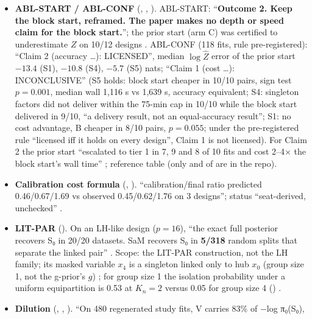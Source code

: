 \begin{itemize}
completed fits from this machine''; on 3 designs max$|\Delta$PIP$|$ up to $1.29\cdot10^{-3}$ (S5 r002), MPMs differ in 0 rows; ``It says
nothing about the rate of MPM disagreement in the study'' .
\item {} \textbf{ABL-START / ABL-CONF} (, , ). ABL-START: ``\textbf{Outcome 2. Keep the block start,
reframed. The paper makes no depth or speed claim for the block start.}''; the prior start (arm C) was certified to underestimate $Z$ on 10/12
designs . ABL-CONF (118 fits, rule pre-registered): ``Claim 2 (accuracy \dots): LICENSED'',
median $\log\hat Z$ error of the prior start $-13.4$ (S1), $-10.8$ (S4), $-5.7$ (S5) nats; ``Claim 1 (cost \dots): INCONCLUSIVE''
(S5 holds: block start cheaper in 10/10 pairs, sign test $p=0.001$, median wall 1,116 s vs 1,639 s, accuracy equivalent; S4: singleton factors did not deliver within the 75-min cap in 10/10 while the block start delivered in 9/10, ``a delivery result, not an equal-accuracy result''; S1: no cost advantage, B cheaper in 8/10 pairs, $p=0.055$; under the pre-registered rule ``licensed iff it holds on every design'', Claim 1 is not licensed). For Claim 2 the prior start ``escalated to tier 1 in 7, 9 and 8 of 10 fits and cost 2–4× the block start's wall time''
; reference table  (only
 and  of  are in the repo).
\item {} \textbf{Calibration cost formula} (, ). ``calibration/final ratio predicted 0.46/0.67/1.69 vs observed
0.45/0.62/1.76 on 3 designs''; status ``seat-derived, unchecked'' .
\item {} \textbf{LIT-PAR} (). On an LH-like design ($p=16$), ``the exact full posterior recovers S₀ in 20/20 datasets.
SaM recovers S₀ in \textbf{5/318} random splits that separate the linked pair'' . Scope: the LIT-PAR construction, not the LH family; its masked variable $x_4$ is a singleton linked only to hub $x_0$ (group size 1, not the g-prior's $g$) ; for group size 1 the isolation probability under a uniform equipartition is 0.53 at $K_n=2$ versus 0.05 for group size 4 () .
\item {} \textbf{Dilution} (, , ). ``On 480 regenerated study fits, V carries 83\% of −log π₀(S₀),

\end{itemize}
